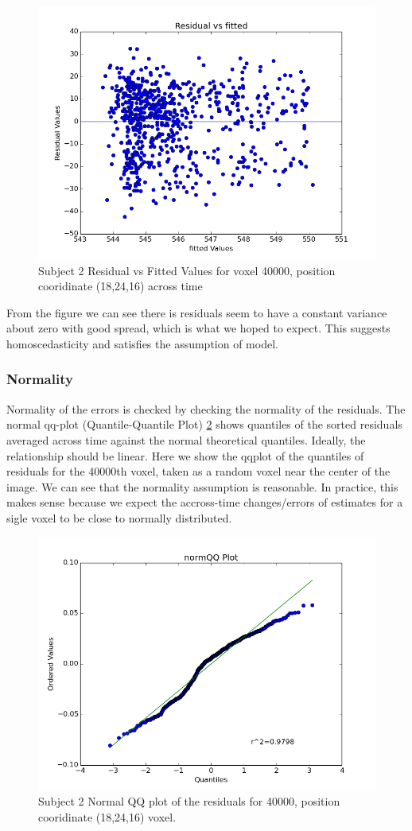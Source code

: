 \begin{figure}[ht]
\centering
\includegraphics[scale=0.5]{figures/res_fitted}  
\caption{Subject 2 Residual vs Fitted Values for voxel 40000, position 
cooridinate (18,24,16) across time}
\label{fig:residual_vs_fitted}
\end{figure}

From the figure we can see there is residuals seem to have a constant variance
about zero with good spread, which is what we hoped to expect. This suggests 
homoscedasticity and satisfies the assumption of model. 

\subsubsection{Normality}
Normality of the errors is checked by checking the normality of the residuals. 
The normal qq-plot (Quantile-Quantile Plot) \ref{fig:qqplot} shows quantiles
of the sorted residuals averaged across time against the normal theoretical 
quantiles. Ideally, the relationship should be linear. Here we show the qqplot
of the quantiles of residuals for the 40000th voxel, taken as a random voxel 
near the center of the image. We can see that the normality assumption is 
reasonable. In practice, this makes sense because we expect the accross-time
changes/errors of estimates for a sigle voxel to be close to normally 
distributed.

\begin{figure}[ht]
\centering
\includegraphics[scale=0.5]{figures/qqplot}  
\caption{Subject 2 Normal QQ plot of the residuals for 40000, position 
cooridinate (18,24,16) voxel.}
\label{fig:qqplot}
\end{figure}



